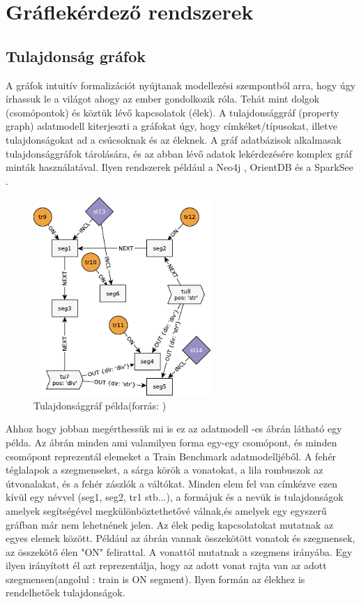 \section{Gráflekérdező rendszerek}
\subsection{Tulajdonság gráfok}

A gráfok intuitív formalizációt nyújtanak modellezési szempontból arra, hogy úgy írhassuk le a világot ahogy az ember gondolkozik róla. Tehát mint dolgok (csomópontok) és köztük lévő kapcsolatok (élek)\cite{marton2017model}. A tulajdonsággráf (property graph) adatmodell kiterjeszti a gráfokat úgy, hogy címkéket/típusokat, illetve tulajdonságokat ad a csúcsoknak és az éleknek. A gráf adatbázisok  alkalmasak tulajdonsággráfok tárolására, és az abban lévő adatok lekérdezésére komplex gráf minták használatával. Ilyen rendszerek például a Neo4j \cite{neo4j}, OrientDB \cite{orientdb} és a  SparkSee \cite{sparksee}.

\begin{figure}
	\centering
	\includegraphics[width=0.6\textwidth]{figures/tulajdonsággráfpélda}
	\caption{Tulajdonsággráf példa(forrás: \cite{marton2017model})}
	\label{fig:tulajdonsággráfpélda}
\end{figure}

Ahhoz hogy jobban megérthessük mi is ez az adatmodell  -es ábrán látható egy példa. Az ábrán minden ami valamilyen forma egy-egy csomópont, és minden csomópont reprezentál elemeket a Train Benchmark adatmodelljéből. A fehér téglalapok a szegmenseket,  a sárga körök a vonatokat, a lila rombuszok az útvonalakat, és a fehér zászlók a váltókat. Minden elem fel van címkézve ezen kívül egy névvel (seg1, seg2, tr1 stb...), a formájuk és a nevük is tulajdonságok amelyek segítségével megkülönböztethetővé válnak,és amelyek egy egyszerű gráfban már nem lehetnének jelen. Az élek pedig kapcsolatokat mutatnak az egyes elemek között. Például az ábrán vannak összekötött vonatok és szegmensek, az összekötő élen "ON" felirattal. A vonattól mutatnak a szegmens irányába. Egy ilyen irányított él azt reprezentálja, hogy az adott vonat rajta van az adott szegmensen(angolul : train is ON segment). Ilyen formán az élekhez is rendelhetőek tulajdonságok. 


